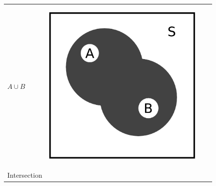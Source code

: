\begin{center}
\begin{xtabular*}{\mytablewidth}[t]{|p{10\mystarwidth}|p{10\mystarwidth}|p{10\mystarwidth}|p{10\mystarwidth}|}
        \begin{math}A\cup B\end{math} &
    
    
        
    \setcounter{subfigure}{0}

\label{m39373*uid14547}
    \begin{center}
    \label{m39373*uid14547!!!underscore!!!media}\label{m39373*uid14547!!!underscore!!!printimage}\includegraphics[width=300px]{col11306.imgs/m39373_union.png} %
        
      \vspace{2pt}
    \vspace{.1in}
    
    \end{center}



    \addtocounter{footnote}{-0}
     \tabularnewline{}
    
    
        Intersection &
    
    

\end{xtabular*}
\end{center}

